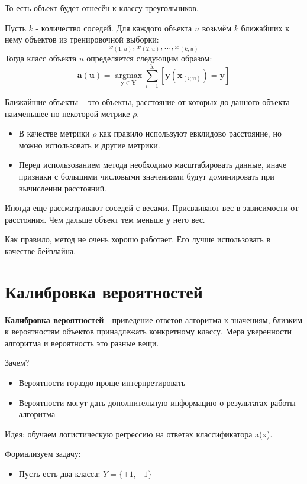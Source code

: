\documentclass{article}
\begin{document}
То есть объект будет отнесён к классу треугольников.

Пусть $k$ - количество соседей. Для каждого объекта $u$
возьмём $k$ ближайших к нему объектов из тренировочной
выборки:
$$
x_{(1 ; u)}, x_{(2 ; u)}, \ldots, x_{(k ; u)}
$$
Тогда класс объекта $u$ определяется следующим образом:
$$
\boldsymbol{a}(\boldsymbol{u})=\underset{\boldsymbol{y} \in \boldsymbol{Y}}{\operatorname{argmax}} \sum_{i=1}^{\boldsymbol{k}}\left[\boldsymbol{y}\left(\boldsymbol{x}_{(i ; \boldsymbol{u})}\right)=\boldsymbol{y}\right]
$$

Ближайшие объекты – это объекты, расстояние от которых до данного объекта наименьшее по некоторой метрике $\rho$.

\begin{itemize}
    \item В качестве метрики $\rho$ как правило используют евклидово расстояние, но можно использовать и другие метрики.
    \item Перед использованием метода необходимо масштабировать данные, иначе признаки с большими числовыми значениями будут доминировать при вычислении расстояний.
\end{itemize}

Иногда еще рассматривают соседей с весами. Присваивают вес в зависимости от расстояния. Чем дальше объект тем меньше у него вес.

Как правило, метод не очень хорошо работает. Его лучше использовать в качестве бейзлайна.

\section{Калибровка вероятностей}
\textbf{Калибровка вероятностей} - приведение ответов алгоритма к значениям, близким к вероятностям объектов принадлежать конкретному классу. Мера уверенности алгоритма и вероятность это разные вещи.

Зачем?
\begin{itemize}
    \item Вероятности гораздо проще интерпретировать
    \item Вероятности могут дать дополнительную информацию о результатах работы алгоритма
\end{itemize}

Идея: обучаем логистическую регрессию на ответах классификатора a(x).

Формализуем задачу:
\begin{itemize}
    \item Пусть есть два класса: $Y=\{+1, -1\}$
\end{itemize}
\end{document}
